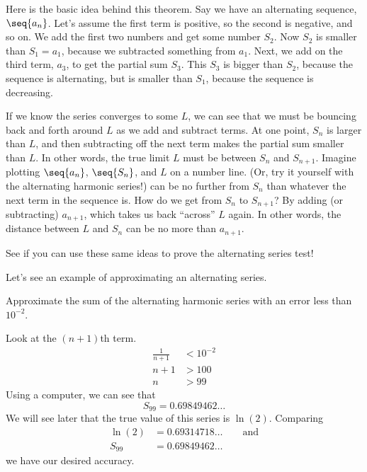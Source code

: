 \documentclass{ximera}
\begin{document}
Here is the basic idea behind this theorem.  Say we have an alternating sequence, 
$\seq{a_n}$.  Let's assume the first term is positive, so the second is negative, and 
so on.  We add the first two numbers and get some number $S_2$.  Now $S_2$ is 
smaller than $S_1 = a_1$, because we subtracted something from $a_1$.  Next, we 
add on the third term, $a_3$, to get the partial sum $S_3$.  This $S_3$ is bigger than 
$S_2$, because the sequence is alternating, but is smaller than $S_1$, because the
sequence is decreasing.

If we know the series converges to some $L$, we can see that we must be bouncing 
back and forth around $L$ as we add and subtract terms.  At one point, 
$S_n$ is larger than $L$, and then subtracting off the next term makes the partial sum 
smaller than $L$.  In other words, the 
true limit $L$ must be between $S_n$ and $S_{n+1}$.  Imagine plotting $\seq{a_n}$, 
$\seq{S_n}$, and $L$ on a number line.  (Or, try it yourself with the alternating harmonic 
series!)  can be no further from $S_n$ than whatever the next term in the sequence 
is.  How do we get from $S_n$ to $S_{n+1}$?  By adding (or subtracting) $a_{n+1}$, which 
takes us back ``across'' $L$ again.  In other words, the distance between $L$ and $S_n$ can 
be no more than $a_{n+1}$.

See if you can use these same ideas to prove the alternating series test!

Let's see an example of approximating an alternating series.

\begin{example}
Approximate the sum of the alternating harmonic series with an error less than $10^{-2}$.
\begin{explanation}
  Look at the $(n+1)$th term.
	\begin{align*}
	\frac{1}{n+1} &< 10^{-2}\\
	n+1&> 100\\
	n&> 99 
	\end{align*}
	Using a computer, we can see that
        \[
        S_{99} = 0.69849462\dots
        \]
        We will see later that the true value of this series is $\ln(2)$. Comparing
        \begin{align*}
          \ln(2) &= 0.69314718\dots \qquad \text{and}\\
          S_{99} &= 0.69849462\dots
        \end{align*}
         we have our desired accuracy.
\end{explanation}
\end{example}
\end{document}
